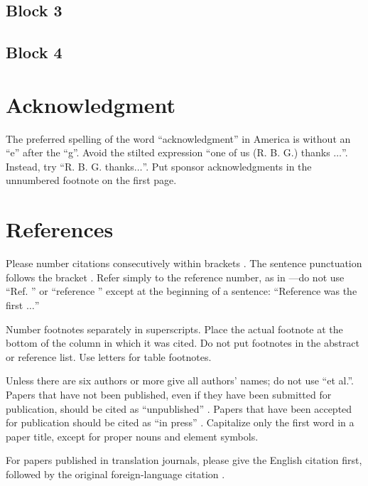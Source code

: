 \documentclass[conference]{IEEEtran}
\begin{document}
\subsection{Block 3}

\subsection{Block 4}


\section*{Acknowledgment}

The preferred spelling of the word ``acknowledgment'' in America is without 
an ``e'' after the ``g''. Avoid the stilted expression ``one of us (R. B. 
G.) thanks $\ldots$''. Instead, try ``R. B. G. thanks$\ldots$''. Put sponsor 
acknowledgments in the unnumbered footnote on the first page.

\section*{References}

Please number citations consecutively within brackets \cite{b1}. The 
sentence punctuation follows the bracket \cite{b2}. Refer simply to the reference 
number, as in \cite{b3}---do not use ``Ref. \cite{b3}'' or ``reference \cite{b3}'' except at 
the beginning of a sentence: ``Reference \cite{b3} was the first $\ldots$''

Number footnotes separately in superscripts. Place the actual footnote at 
the bottom of the column in which it was cited. Do not put footnotes in the 
abstract or reference list. Use letters for table footnotes.

Unless there are six authors or more give all authors' names; do not use 
``et al.''. Papers that have not been published, even if they have been 
submitted for publication, should be cited as ``unpublished'' \cite{b4}. Papers 
that have been accepted for publication should be cited as ``in press'' \cite{b5}. 
Capitalize only the first word in a paper title, except for proper nouns and 
element symbols.

For papers published in translation journals, please give the English 
citation first, followed by the original foreign-language citation \cite{b6}.
\end{document}
